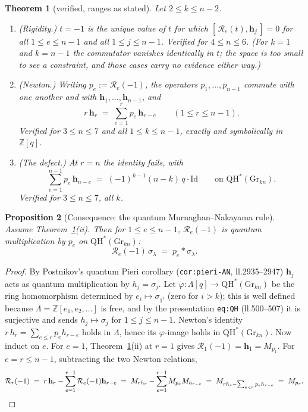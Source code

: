 \documentclass[11pt]{article}
\theoremstyle{plain}
\newtheorem{theorem}{Theorem}
\newtheorem{proposition}[theorem]{Proposition}
\theoremstyle{definition}
\newcommand{\QH}{\mathrm{QH}^*}
\newcommand{\Gr}{\mathrm{Gr}}
\newcommand{\ZZ}{\mathbb{Z}}
\begin{document}
\begin{theorem}[verified, ranges as stated]\label{thm:B}
Let $2\le k\le n-2$.
\begin{enumerate}
\item[(i)] \emph{(Rigidity.)}  $t=-1$ is the unique value of $t$ for
  which $[\,\mathcal R_e(t),\mathbf h_j\,]=0$ for all $1\le e\le n-1$ and
  all $1\le j\le n-1$.  Verified for $4\le n\le 6$.  (For $k=1$ and
  $k=n-1$ the commutator vanishes identically in $t$; the space is too
  small to see a constraint, and those cases carry no evidence either
  way.)
\item[(ii)] \emph{(Newton.)}  Writing $p_e:=\mathcal R_e(-1)$, the
  operators $p_1,\dots,p_{n-1}$ commute with one another and with
  $\mathbf h_1,\dots,\mathbf h_{n-1}$, and
  \[
  r\,\mathbf h_r \;=\; \sum_{e=1}^{r} p_e\,\mathbf h_{r-e}
  \qquad (1\le r\le n-1).
  \]
  Verified for $3\le n\le 7$ and all $1\le k\le n-1$, exactly and
  symbolically in $\ZZ[q]$.
\item[(iii)] \emph{(The defect.)}  At $r=n$ the identity fails, with
  \[
  \sum_{e=1}^{n-1}p_e\,\mathbf h_{n-e}\;=\;(-1)^{k-1}(n-k)\,q\cdot\mathrm{Id}
  \qquad\text{on }\QH(\Gr_{kn}).
  \]
  Verified for $3\le n\le 7$, all $k$.
\end{enumerate}
\end{theorem}

\begin{proposition}[Consequence: the quantum Murnaghan--Nakayama rule]\label{prop:MN}
Assume Theorem~\ref{thm:B}(ii).  Then for $1\le e\le n-1$,
$\mathcal R_e(-1)$ is quantum multiplication by $p_e$ on
$\QH(\Gr_{kn})$:
\[
\mathcal R_e(-1)\,\sigma_\lambda \;=\; p_e * \sigma_\lambda .
\]
\end{proposition}

\begin{proof}
By Postnikov's quantum Pieri corollary (\texttt{cor:pieri-AN},
ll.2935--2947) $\mathbf h_j$ acts as quantum multiplication by
$h_j=\sigma_j$.  Let $\varphi:\Lambda[q]\to\QH(\Gr_{kn})$ be the ring
homomorphism determined by $e_i\mapsto\sigma_{1^i}$ (zero for $i>k$);
this is well defined because $\Lambda=\ZZ[e_1,e_2,\dots]$ is free, and by
the presentation \texttt{eq:QH} (ll.500--507) it is surjective and sends
$h_j\mapsto\sigma_j$ for $1\le j\le n-1$.  Newton's identity
$r\,h_r=\sum_{e\le r}p_eh_{r-e}$ holds in $\Lambda$, hence its
$\varphi$-image holds in $\QH(\Gr_{kn})$.  Now induct on $e$.  For $e=1$,
Theorem~\ref{thm:B}(ii) at $r=1$ gives
$\mathcal R_1(-1)=\mathbf h_1=M_{p_1}$.  For $e=r\le n-1$, subtracting
the two Newton relations,
\[
\mathcal R_r(-1)\;=\;r\,\mathbf h_r-\sum_{e=1}^{r-1}\mathcal R_e(-1)\mathbf h_{r-e}
\;=\;M_{r h_r}-\sum_{e=1}^{r-1}M_{p_e}M_{h_{r-e}}
\;=\;M_{r h_r-\sum_{e<r}p_eh_{r-e}}\;=\;M_{p_r}. \qedhere
\]
\end{proof}
\end{document}
